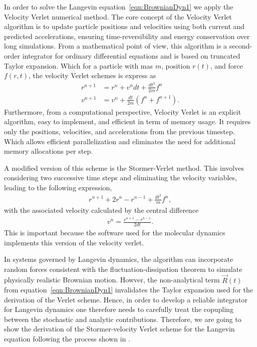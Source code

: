 In order to solve the Langevin equation~\eqref{eqn:BrownianDyn1} we apply the Velocity Verlet numerical method.
The core concept of the Velocity Verlet algorithm is to update particle positions and velocities using both current and predicted accelerations, ensuring time-reversibility and energy conservation over long simulations. 
From a mathematical point of view, this algorithm is a second-order integrator for ordinary differential equations and is based on truncated Taylor expansion.
Which for a particle with mas $m$, position $r(t)$, and force $f(r,t)$, the velocity Verlet schemes is express as
\begin{align}
    r^{n+1} &= r^n + v^n dt + \frac{dt^2}{2m}f^n \\
    v^{n+1} &= v^n + \frac{dt}{2m}(f^n+f^{n+1}).
\end{align}
Furthermore, from a computational perspective, Velocity Verlet is an explicit algorithm, easy to implement, and efficient in term of memory usage.
It requires only the positions, velocities, and accelerations from the previous timestep.
Which allows efficient parallelization and eliminates the need for additional memory allocations per step.

A modified version of this scheme is the Stormer-Verlet method. 
This involves considering two successive time steps and eliminating the velocity variables, leading to the following expression,
\begin{align}
    r^{n+1} + 2r^{n} - r^{n-1} + \frac{dt^2}{m}f^{n},
\end{align}
with the associated velocity calculated by the central difference
\begin{align}
    v^n = \frac{r^{n+1} - r^{n-1}}{2dt}.
\end{align}
This is important because the software used for the molecular dynamics implements this version of the velocity verlet.

In systems governed by Langevin dynamics, the algorithm can incorporate random forces consistent with the fluctuation-dissipation theorem to simulate physically realistic Brownian motion.
Howver, the non-analytical term $\vec{R}(t)$ from equation~\eqref{eqn:BrownianDyn1} invalidates the Taylor expansion used for the derivation of the Verlet scheme.
Hence, in order to develop a reliable integrator for Langevin dynamics one therefore needs to carefully treat the copupling between the stochastic and analytic contributions.
Therefore, we are going to show the derivation of the Stormer-velocity Verlet scheme for the Langevin equation following the process shown in \citep{gronbech-jensenSimpleEffectiveVerlettype2013a}.


